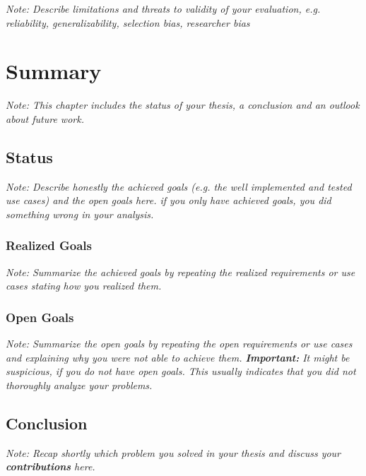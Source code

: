 \documentclass[a4paper,12pt,twoside]{report}
\begin{document}
\textit{Note: Describe limitations and threats to validity of your evaluation, e.g. reliability, generalizability, selection bias, researcher bias}












\chapter{Summary}

\textit{Note: This chapter includes the status of your thesis, a conclusion and an outlook about future work.}

\section{Status}

\textit{Note: Describe honestly the achieved goals (e.g. the well implemented and tested use cases) and the open goals here. if you only have achieved goals, you did something wrong in your analysis.}

\subsection{Realized Goals}

\textit{Note: Summarize the achieved goals by repeating the realized requirements or use cases stating how you realized them.}

\subsection{Open Goals}

\textit{Note: Summarize the open goals by repeating the open requirements or use cases and explaining why you were not able to achieve them. \textbf{Important:} It might be suspicious, if you do not have open goals. This usually indicates that you did not thoroughly analyze your problems.}

\section{Conclusion}

\textit{Note: Recap shortly which problem you solved in your thesis and discuss your \textbf{contributions} here.}
\end{document}
